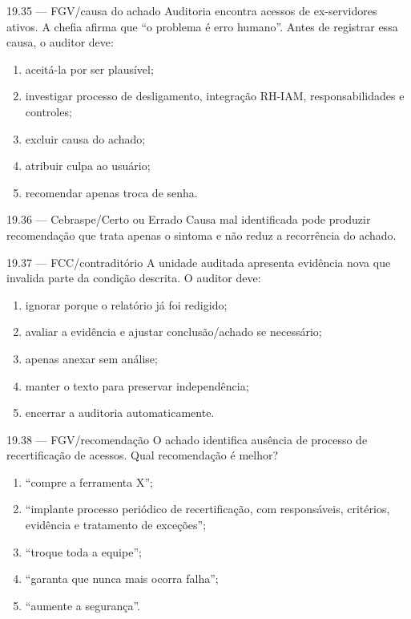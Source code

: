 \begin{questao}{ 19.35 — FGV/causa do achado}
Auditoria encontra acessos de ex-servidores ativos. A chefia afirma que ``o problema é erro humano''. Antes de registrar essa causa, o auditor deve:
\begin{enumerate}[label=\Alph*)]
\item aceitá-la por ser plausível;
\item investigar processo de desligamento, integração RH-IAM, responsabilidades e controles;
\item excluir causa do achado;
\item atribuir culpa ao usuário;
\item recomendar apenas troca de senha.
\end{enumerate}
\end{questao}

\begin{questao}{ 19.36 — Cebraspe/Certo ou Errado}
Causa mal identificada pode produzir recomendação que trata apenas o sintoma e não reduz a recorrência do achado.
\end{questao}

\begin{questao}{ 19.37 — FCC/contraditório}
A unidade auditada apresenta evidência nova que invalida parte da condição descrita. O auditor deve:
\begin{enumerate}[label=\Alph*)]
\item ignorar porque o relatório já foi redigido;
\item avaliar a evidência e ajustar conclusão/achado se necessário;
\item apenas anexar sem análise;
\item manter o texto para preservar independência;
\item encerrar a auditoria automaticamente.
\end{enumerate}
\end{questao}

\begin{questao}{ 19.38 — FGV/recomendação}
O achado identifica ausência de processo de recertificação de acessos. Qual recomendação é melhor?
\begin{enumerate}[label=\Alph*)]
\item ``compre a ferramenta X'';
\item ``implante processo periódico de recertificação, com responsáveis, critérios, evidência e tratamento de exceções'';
\item ``troque toda a equipe'';
\item ``garanta que nunca mais ocorra falha'';
\item ``aumente a segurança''.
\end{enumerate}
\end{questao}

